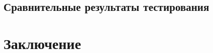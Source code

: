 \documentclass[a4paper]{report}
\begin{document}

\section{Сравнительные результаты тестирования}


\chapter*{Заключение}


\end{document}

